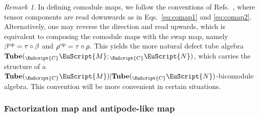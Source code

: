 \documentclass[a4paper,11pt]{article}
\theoremstyle{definition}
\theoremstyle{remark}
\newtheorem{remark}[theorem]{Remark}
\newcommand\eC           {\EuScript{C}}
\newcommand\eM          {\EuScript{M}}
\newcommand\eN         {\EuScript{N}}
\begin{document}
\begin{remark}\label{rmk:optubeConvention}
    In defining comodule maps, we follow the conventions of Refs.~\cite{jia2024weakTube,jia2025tube}, where tensor components are read downwards as in Eqs.~\eqref{eq:comap1} and \eqref{eq:comap2}. Alternatively, one may reverse the direction and read upwards, which is equivalent to composing the comodule maps with the swap map, namely $\beta^{\rm op}=\tau\circ \beta$ and $\rho^{\rm op}=\tau\circ \rho$. This yields the more natural defect tube algebra $\mathbf{Tube}({_{\eC}\eM};{_{\eC}\eN})$, which carries the structure of a $\mathbf{Tube}({_{\eC}}\eM)|\mathbf{Tube}({_{\eC}}\eN)$-bicomodule algebra. This convention will be more convenient in certain situations.
\end{remark}

\subsubsection{Factorization map and antipode-like map}
\end{document}
